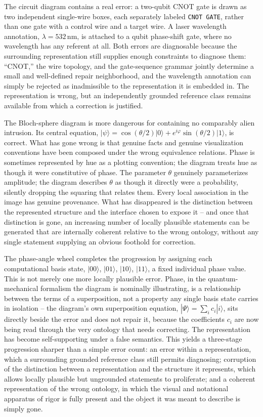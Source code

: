 \documentclass[11pt]{article}
\begin{document}
The circuit diagram contains a real error: a two-qubit CNOT gate is drawn as two independent single-wire boxes, each separately labeled \texttt{CNOT GATE}, rather than one gate with a control wire and a target wire. A laser wavelength annotation, $\lambda = 532\,\mathrm{nm}$, is attached to a qubit phase-shift gate, where no wavelength has any referent at all. Both errors are diagnosable because the surrounding representation still supplies enough constraints to diagnose them: ``CNOT,'' the wire topology, and the gate-sequence grammar jointly determine a small and well-defined repair neighborhood, and the wavelength annotation can simply be rejected as inadmissible to the representation it is embedded in. The representation is wrong, but an independently grounded reference class remains available from which a correction is justified.

The Bloch-sphere diagram is more dangerous for containing no comparably alien intrusion. Its central equation, $|\psi\rangle = \cos(\theta/2)|0\rangle + e^{i\varphi}\sin(\theta/2)|1\rangle$, is correct. What has gone wrong is that genuine facts and genuine visualization conventions have been composed under the wrong equivalence relations. Phase is sometimes represented by hue as a plotting convention; the diagram treats hue as though it were constitutive of phase. The parameter $\theta$ genuinely parameterizes amplitude; the diagram describes $\theta$ as though it directly were a probability, silently dropping the squaring that relates them. Every local association in the image has genuine provenance. What has disappeared is the distinction between the represented structure and the interface chosen to expose it -- and once that distinction is gone, an increasing number of locally plausible statements can be generated that are internally coherent relative to the wrong ontology, without any single statement supplying an obvious foothold for correction.

The phase-angle wheel completes the progression by assigning each computational basis state, $|00\rangle$, $|01\rangle$, $|10\rangle$, $|11\rangle$, a fixed individual phase value. This is not merely one more locally plausible error. Phase, in the quantum-mechanical formalism the diagram is nominally illustrating, is a relationship between the terms of a superposition, not a property any single basis state carries in isolation -- the diagram's own superposition equation, $|\Psi\rangle = \sum_i c_i|i\rangle$, sits directly beside the error and does not repair it, because the coefficients $c_i$ are now being read through the very ontology that needs correcting. The representation has become self-supporting under a false semantics. This yields a three-stage progression sharper than a simple error count: an error within a representation, which a surrounding grounded reference class still permits diagnosing; corruption of the distinction between a representation and the structure it represents, which allows locally plausible but ungrounded statements to proliferate; and a coherent representation of the wrong ontology, in which the visual and notational apparatus of rigor is fully present and the object it was meant to describe is simply gone.
\end{document}
